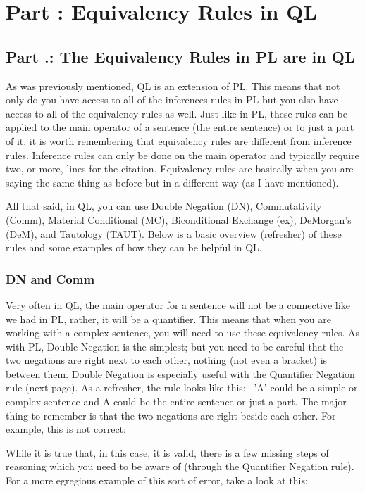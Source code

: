 \setcounter{seccount}{1}
\chapter{Part \thechapcount: Equivalency Rules in QL}
\section{Part \thechapcount.\theseccount: The Equivalency Rules in PL are in QL}
As was previously mentioned, QL is an extension of PL. This means that not only do you have access to all of the inferences rules in PL but you also have access to all of the equivalency rules as well. Just like in PL, these rules can be applied to the main operator of a sentence (the entire sentence) or to just a part of it. it is worth remembering that equivalency rules are different from inference rules. Inference rules can only be done on the main operator and typically require two, or more, lines for the citation. Equivalency rules are basically when you are saying the same thing as before but in a different way (as I have mentioned). 

All that said, in QL, you can use Double Negation (DN), Commutativity (Comm), Material Conditional (MC), Biconditional Exchange (\eiff ex), DeMorgan's (DeM), and Tautology (TAUT). Below is a basic overview (refresher) of these rules and some examples of how they can be helpful in QL.

\subsection{DN and Comm}

Very often in QL, the main operator for a sentence will not be a connective like we had in PL, rather, it will be a quantifier. This means that when you are working with a complex sentence, you will need to use these equivalency rules. As with PL, Double Negation is the simplest; but you need to be careful that the two negations are right next to each other, nothing (not even a bracket) is between them. Double Negation is especially useful with the Quantifier Negation rule (next page). As a refresher, the rule looks like this: 
'A' could be a simple or complex sentence and A could be the entire sentence or just a part. The major thing to remember is that the two negations are right beside each other. For example, this is not correct:
\begin{fitchproof}
\end{fitchproof}
While it is true that, in this case, it is valid, there is a few missing steps of reasoning which you need to be aware of (through the Quantifier Negation rule). For a more egregious example of this sort of error, take a look at this: 
\begin{fitchproof}
\end{fitchproof}

